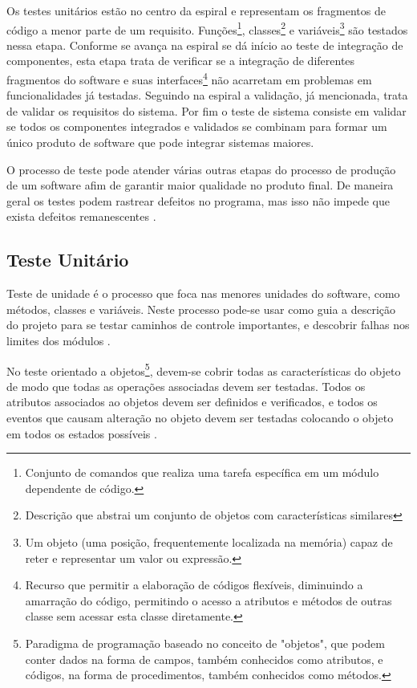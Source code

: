 Os testes unitários estão no centro da espiral e representam os fragmentos de código a menor parte de um requisito. Funções\footnote{Conjunto de comandos que realiza uma tarefa específica em um módulo dependente de código.}, classes\footnote{Descrição que abstrai um conjunto de objetos com características similares} e variáveis\footnote{Um objeto (uma posição, frequentemente localizada na memória) capaz de reter e representar um valor ou expressão. } são testados nessa etapa. Conforme se avança na espiral se dá início ao teste de integração de componentes, esta etapa trata de verificar se a integração de diferentes fragmentos do software e suas interfaces\footnote{Recurso que permitir a elaboração de códigos flexíveis, diminuindo a amarração do código, permitindo o acesso a atributos e métodos de outras classe sem acessar esta classe diretamente.} não acarretam em problemas em funcionalidades já testadas. Seguindo na espiral a validação, já mencionada, trata de validar os requisitos do sistema. Por fim o teste de sistema consiste em validar se todos os componentes integrados e validados se combinam para formar um único produto de software que pode integrar sistemas maiores.

 O processo de teste pode atender várias outras etapas do processo de produção de um software afim de garantir maior qualidade no produto final. De maneira geral os testes podem rastrear defeitos no programa, mas isso não impede que exista defeitos remanescentes \cite{SOMMER2011}.

\subsection{Teste Unitário}

Teste de unidade é o processo que foca nas menores unidades do software, como métodos, classes e variáveis. Neste processo pode-se usar como guia a descrição do projeto para se testar caminhos de controle importantes, e descobrir falhas nos limites dos módulos \cite{PRESMA2016}.

No teste orientado a objetos\footnote{Paradigma de programação baseado no conceito de "objetos", que podem conter dados na forma de campos, também conhecidos como atributos, e códigos, na forma de procedimentos, também conhecidos como métodos.}, devem-se cobrir todas as características  do objeto de modo que todas as operações associadas devem ser testadas. Todos os atributos associados ao objetos devem ser definidos e verificados, e todos os eventos que causam alteração no objeto devem ser testadas colocando o objeto em todos os estados possíveis \cite{SOMMER2011}.

